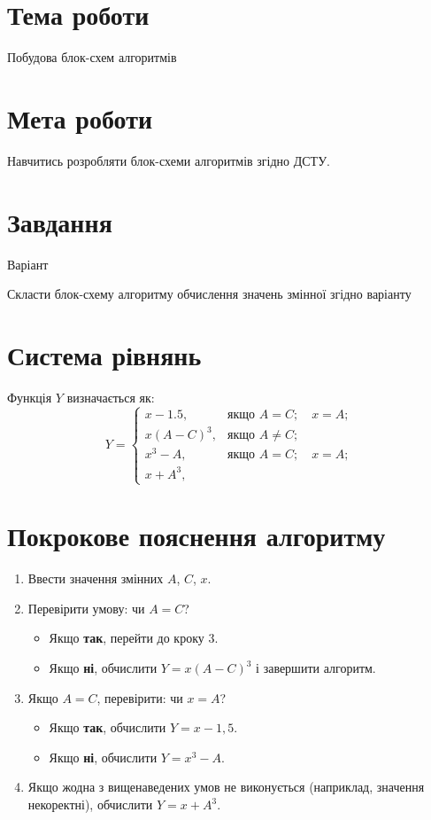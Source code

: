 \documentclass[a4paper]{article}
\begin{document}
\section*{Тема роботи}
Побудова блок-схем алгоритмів

\section*{Мета роботи}
Навчитись розробляти блок-схеми алгоритмів згідно ДСТУ.

\section*{Завдання}
Варіант 

Скласти блок-схему алгоритму обчислення значень змінної згідно варіанту



\section*{Система рівнянь}
Функція \( Y \) визначається як:
\[
Y = 
\begin{cases}
x - 1.5, & \text{якщо } A = C; \quad x = A; \\
x(A - C)^3, & \text{якщо } A \ne C; \\
x^3 - A, & \text{якщо } A = C; \quad x = A; \\
x + A^3, & 
\end{cases}
\]



\section*{Покрокове пояснення алгоритму}

\begin{enumerate}
    \item Ввести значення змінних \( A \), \( C \), \( x \).
    \item Перевірити умову: чи \( A = C \)?
    \begin{itemize}
        \item Якщо \textbf{так}, перейти до кроку 3.
        \item Якщо \textbf{ні}, обчислити \( Y = x(A - C)^3 \) і завершити алгоритм.
    \end{itemize}
    \item Якщо \( A = C \), перевірити: чи \( x = A \)?
    \begin{itemize}
        \item Якщо \textbf{так}, обчислити \( Y = x - 1{,}5 \).
        \item Якщо \textbf{ні}, обчислити \( Y = x^3 - A \).
    \end{itemize}
    \item Якщо жодна з вищенаведених умов не виконується (наприклад, значення некоректні), обчислити \( Y = x + A^3 \).
\end{enumerate}
\newpage
\end{document}
